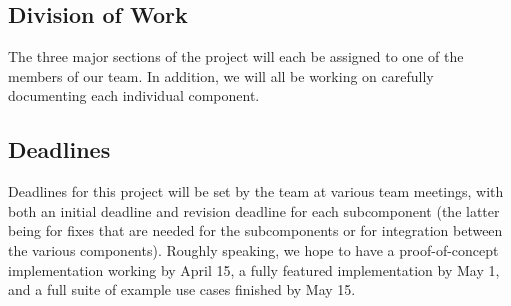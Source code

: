 \documentclass[11pt]{article}
\begin{document}
\subsection{Division of Work}
The three major sections of the project will each be assigned to one of the members of our team. In addition, we will all be working on carefully documenting each individual component.

\subsection{Deadlines}
Deadlines for this project will be set by the team at various team meetings, with both an initial deadline and revision deadline for each subcomponent (the latter being for fixes that are needed for the subcomponents or for integration between the various components).  Roughly speaking, we hope to have a proof-of-concept implementation working by April 15, a fully featured implementation by May 1, and a full suite of example use cases finished by May 15.
\end{document}
